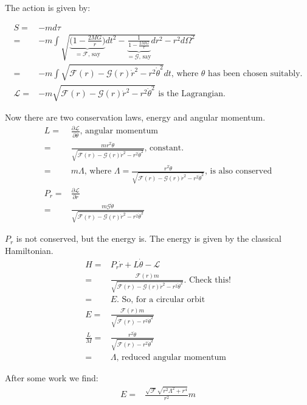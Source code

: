\documentclass[]{article}
\newcommand{\Lagr}{\mathscr{L}}
\begin{document}
{The action is given by:

\begin{align*}
	S =&-m d\tau\\
	=& -m \int \sqrt{\underbrace{\bigg(1-\frac{2MG}{r}\bigg)}_\text{$=\mathscr{F}$, say}dt^2-\underbrace{\frac{1}{1-\frac{2MG}{r}}}_\text{$=\mathscr{G}$, say}dr^2 - r^2 d\Omega^2} \\
	=& -m \int \sqrt{\mathscr{F}(r)-\mathscr{G}(r)\dot{r}^2 - r^2 \dot{\theta}^2} dt \text{, where $\theta$ has been chosen suitably.}\\
	\Lagr =& -m \sqrt{\mathscr{F}(r)-\mathscr{G}(r)\dot{r}^2 - r^2 \dot{\theta}^2} \text{ is the Lagrangian.}
\end{align*}

Now there are two conservation laws, energy and angular momentum.
\begin{align*}
	L =& \frac{\partial \Lagr}{\partial \dot{\theta}} \text{, angular momentum}\\
	=& \frac{m r^2 \dot{\theta}}{\sqrt{\mathscr{F}(r)-\mathscr{G}(r)\dot{r}^2 - r^2 \dot{\theta}^2}} \text{, constant.}\\
	=& m \Lambda \text{, where $\Lambda=\frac{r^2 \dot{\theta}}{\sqrt{\mathscr{F}(r)-\mathscr{G}(r)\dot{r}^2 - r^2 \dot{\theta}^2}}$, is also conserved}\\
	P_r =& \frac{\partial \Lagr}{\partial \dot{r}}\\
	=& \frac{m \mathscr{G} \dot{\theta}}{\sqrt{\mathscr{F}(r)-\mathscr{G}(r)\dot{r}^2 - r^2 \dot{\theta}^2}}
\end{align*}

$P_r$ is not conserved, but the energy is. The energy is given by the classical Hamiltonian.
\begin{align*}
	H =& P_r \dot{r} + L \dot{\theta} - \Lagr\\
	=& \frac{\mathscr{F}(r)m}{\sqrt{\mathscr{F}(r)-\mathscr{G}(r)\dot{r}^2 - r^2 \dot{\theta}^2}} \text{. Check this!}\\
	=& E \text{. So, for a circular orbit}\\
	E =& \frac{\mathscr{F}(r)m}{\sqrt{\mathscr{F}(r)- r^2 \dot{\theta}^2}} \\
	\frac{L}{M} =& \frac{r^2 \dot{\theta}}{\sqrt{\mathscr{F}(r) - r^2 \dot{\theta}^2}}\\
	=& \Lambda \text{, reduced angular momentum}
\end{align*}

After some work we find:
\begin{align*}
	E =& \frac{\sqrt{\mathscr{F}} \sqrt{r^2 \Lambda^2 + r^4}}{r^2} m
\end{align*}

}
\end{document}
